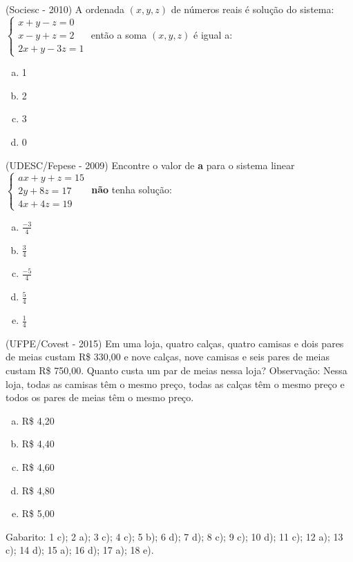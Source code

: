 \begin{exer}
 (Sociesc - 2010) A ordenada $(x, y, z)$ de números reais é solução do sistema:
  $\begin{cases}
    x+y-z=0 \\
    x-y+z=2 \\
    2x+y-3z=1
   \end{cases}$ então a soma $(x, y, z)$ é igual a:
  \begin{enumerate}[a)]
  \item 1
  \item 2
  \item 3
  \item 0
 \end{enumerate}
 \end{exer}

 \begin{exer}
 (UDESC/Fepese - 2009) Encontre o valor de \textbf{a} para o sistema linear
 $\begin{cases}
    ax+y+z=15 \\
    2y+8z=17 \\
    4x+4z=19
   \end{cases}$
 \textbf{não} tenha solução:
  \begin{enumerate}[a)]
  \item $\frac{-3}{4}$
  \item $\frac{3}{4}$
  \item $\frac{-5}{4}$
  \item $\frac{5}{4}$
  \item $\frac{1}{4}$
 \end{enumerate}
 \end{exer}

 \begin{exer}
 (UFPE/Covest - 2015) Em uma loja, quatro calças, quatro camisas e dois pares de meias custam R\$ 330,00 e nove calças, nove camisas e seis pares de meias custam R\$ 750,00. Quanto custa um par de meias nessa loja? Observação: Nessa loja, todas as camisas têm o mesmo preço, todas as calças têm o mesmo preço e todos os pares de meias têm o mesmo preço.
 \begin{enumerate}[a)]
  \item R\$ 4,20
  \item R\$ 4,40
  \item R\$ 4,60
  \item R\$ 4,80
  \item R\$ 5,00
 \end{enumerate}
\end{exer}

Gabarito: 1 c); 2 a); 3 c); 4 c); 5 b); 6 d); 7 d); 8 c); 9 c); 10 d); 11 c); 12 a); 13 c); 14 d); 15 a); 16 d); 17 a); 18 e).
